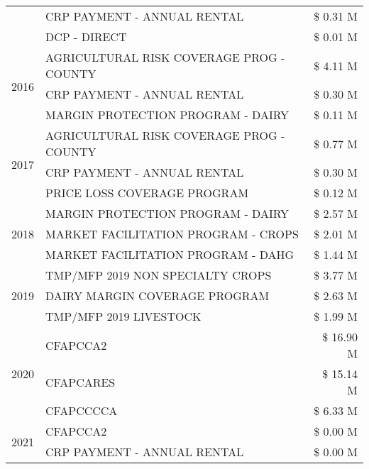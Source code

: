 \begin{tabular}{llr}
 & CRP PAYMENT - ANNUAL RENTAL & \$ 0.31 M \\
 & DCP - DIRECT & \$ 0.01 M \\
\cline{1-3}
\multirow[t]{3}{*}{2016} & AGRICULTURAL RISK COVERAGE PROG - COUNTY & \$ 4.11 M \\
 & CRP PAYMENT - ANNUAL RENTAL & \$ 0.30 M \\
 & MARGIN PROTECTION PROGRAM - DAIRY & \$ 0.11 M \\
\cline{1-3}
\multirow[t]{3}{*}{2017} & AGRICULTURAL RISK COVERAGE PROG - COUNTY & \$ 0.77 M \\
 & CRP PAYMENT - ANNUAL RENTAL & \$ 0.30 M \\
 & PRICE LOSS COVERAGE PROGRAM & \$ 0.12 M \\
\cline{1-3}
\multirow[t]{3}{*}{2018} & MARGIN PROTECTION PROGRAM - DAIRY & \$ 2.57 M \\
 & MARKET FACILITATION PROGRAM - CROPS & \$ 2.01 M \\
 & MARKET FACILITATION PROGRAM - DAHG & \$ 1.44 M \\
\cline{1-3}
\multirow[t]{3}{*}{2019} & TMP/MFP 2019 NON SPECIALTY CROPS & \$ 3.77 M \\
 & DAIRY MARGIN COVERAGE PROGRAM & \$ 2.63 M \\
 & TMP/MFP 2019 LIVESTOCK & \$ 1.99 M \\
\cline{1-3}
\multirow[t]{3}{*}{2020} & CFAPCCA2 & \$ 16.90 M \\
 & CFAPCARES & \$ 15.14 M \\
 & CFAPCCCCA & \$ 6.33 M \\
\cline{1-3}
\multirow[t]{2}{*}{2021} & CFAPCCA2 & \$ 0.00 M \\
 & CRP PAYMENT - ANNUAL RENTAL & \$ 0.00 M \\
\cline{1-3}
\bottomrule
\end{tabular}
